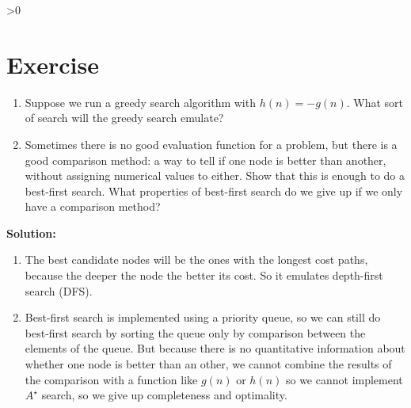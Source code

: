 \documentclass{article}
\newcounter{partCounter}
\newcounter{ExerciseCounter}
\newenvironment{Exercise}[1][-1]{
	\ifnum#1>0
	\setcounter{ExerciseCounter}{#1}
	\fi
	\section{Exercise \arabic{ExerciseCounter}}
	\setcounter{partCounter}{1}
}{
}
\newcommand{\solution}{\textbf{\large Solution:}}
\begin{document}
	\begin{Exercise}[3]
		\begin{enumerate}
			\item Suppose we run a greedy search algorithm with $h(n) = -g(n)$. What sort of
		search will the greedy search emulate?
		
		    \item Sometimes there is no good evaluation function for a problem, but there
		is a good comparison method: a way to tell if one node is better than another,
		without assigning numerical values to either. Show that this is enough to do a
		best-first search. What properties of best-first search do we give up if we only
		have a comparison method? \\
		\end{enumerate}
		
		\solution \\
		
		\begin{enumerate}
			\item The best candidate nodes will be the ones with the longest cost paths, because the deeper the node the better its cost. So it emulates depth-first search (DFS).
			
			\item Best-first search is implemented using a priority queue, so we can still do best-first search by sorting the queue only by comparison between the elements of the queue. But because there is no quantitative information about whether one node is better than an other, we cannot combine the results of the comparison with a function like $g(n)$ or $h(n)$ so we cannot implement $A^{\star}$ search, so we give up completeness and optimality.
		\end{enumerate}
		
	\end{Exercise}
	
	\newpage
	
\end{document}
